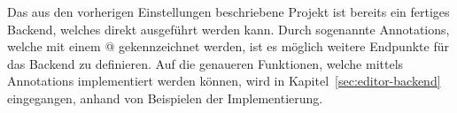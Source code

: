 Das aus den vorherigen Einstellungen beschriebene Projekt ist bereits ein fertiges Backend, welches direkt ausgeführt werden kann.
Durch sogenannte Annotations, welche mit einem @ gekennzeichnet werden, ist es möglich weitere Endpunkte für das Backend zu definieren.
Auf die genaueren Funktionen, welche mittels Annotations implementiert werden können, wird in Kapitel~\ref{sec:editor-backend} eingegangen, anhand von Beispielen der Implementierung.

